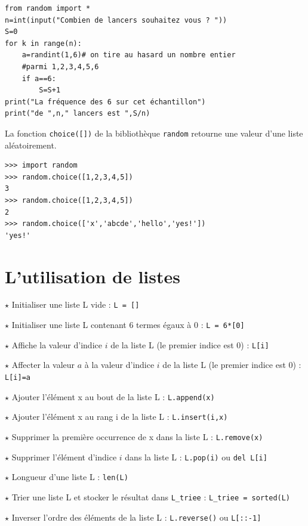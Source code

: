 \begin{lstlisting}
from random import *
n=int(input("Combien de lancers souhaitez vous ? "))
S=0
for k in range(n):
    a=randint(1,6)# on tire au hasard un nombre entier 
    #parmi 1,2,3,4,5,6
    if a==6:
        S=S+1
print("La fréquence des 6 sur cet échantillon")
print("de ",n," lancers est ",S/n)
\end{lstlisting}

La fonction \verb!choice([])! de la bibliothèque \verb!random! retourne une valeur d'une liste aléatoirement. 

\begin{lstlisting}
>>> import random
>>> random.choice([1,2,3,4,5])
3
>>> random.choice([1,2,3,4,5])
2
>>> random.choice(['x','abcde','hello','yes!'])
'yes!'
\end{lstlisting}


\section{L'utilisation de listes}


$\star$ Initialiser une liste L vide : \verb!L = []!

$\star$ Initialiser une liste L contenant 6 termes égaux à 0 : \verb!L = 6*[0]!

$\star$ Affiche la valeur d'indice $i$ de la liste L (le premier indice est 0) :
\verb!L[i]!

$\star$ Affecter la valeur $a$ à la valeur d'indice $i$ de la liste L (le premier indice est 0) :
\verb!L[i]=a!

$\star$ Ajouter l'élément x au bout de la liste L :
\verb!L.append(x)!

$\star$ Ajouter l'élément x au rang i de la liste L :
\verb!L.insert(i,x)!

$\star$ Supprimer la première occurrence de x dans la
liste L : \verb!L.remove(x)!

$\star$ Supprimer l'élément d'indice $i$ dans la liste L :
\verb!L.pop(i)! ou \verb!del L[i]!

$\star$ Longueur d'une liste L :
\verb!len(L)!

$\star$ Trier une liste L et stocker le résultat dans
\verb!L_triee! :
\verb!L_triee = sorted(L)!

$\star$ Inverser l'ordre des éléments de la liste L :
\verb!L.reverse()! ou  \verb~L[::-1]~

